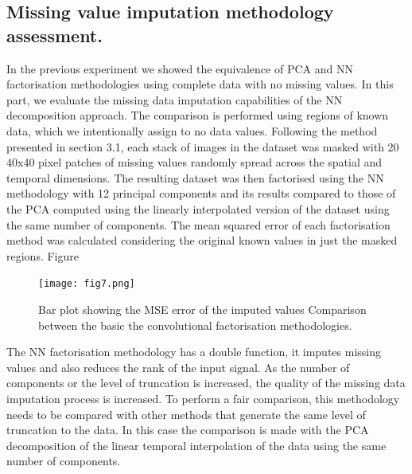 \documentclass[essd, manuscript]{copernicus}
\begin{document}
\subsection{Missing value imputation methodology assessment.}
In the previous experiment we showed the equivalence of PCA and NN factorisation methodologies using complete data with no missing values. In this part, we evaluate the missing data imputation capabilities of the NN decomposition approach. The comparison is performed using regions of known data, which we intentionally assign to no data values. Following the method presented in section 3.1, each stack of images in the dataset was masked with 20 40x40 pixel patches of missing values randomly spread across the spatial and temporal dimensions. The resulting dataset was then factorised using the NN methodology with 12 principal components and its results compared to those of the PCA computed using the linearly interpolated version of the dataset using the same number of components. The mean squared error of each factorisation method was calculated considering the original known values in just the masked regions. Figure 

\begin{figure}
    \texttt{[image: fig7.png]}
    \caption{Bar plot showing the MSE error of the imputed values Comparison between the basic the convolutional factorisation methodologies.}%
    \label{multispectral_cmp}%
\end{figure}

The NN factorisation methodology has a double function, it imputes missing values and also reduces the rank of the input signal. As the number of components or the level of truncation is increased, the quality of the missing data imputation process is increased. To perform a fair comparison, this methodology needs to be compared with other methods that generate the same level of truncation to the data. In this case the comparison is made with the PCA decomposition of the linear temporal interpolation of the data using the same number of components. 
\end{document}
